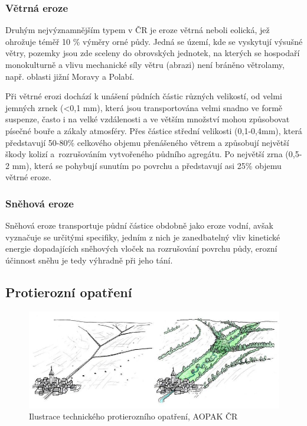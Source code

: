 \subsubsection{Větrná eroze}
Druhým nejvýznamnějším typem v ČR je eroze větrná neboli eolická, jež
ohrožuje téměř 10 \% výměry orné půdy. Jedná se území, kde se
vyskytují výsušné větry, pozemky jsou zde sceleny do obrovských
jednotek, na kterých se hospodaří monokulturně a vlivu mechanické síly
větru (abrazi) není bráněno větrolamy, např. oblasti jižní Moravy a
Polabí.

Při větrné erozi dochází k unášení půdních částic různých velikostí,
od velmi jemných zrnek (<0,1 mm), která jsou transportována velmi
snadno ve formě suspenze, často i na velké vzdálenosti a ve větším
množství mohou způsobovat písečné bouře a zákaly atmosféry. Přes
částice střední velikosti (0,1-0,4mm), která představují 50-80\%
celkového objemu přenášeného větrem a způsobují největší škody kolizí
a~rozrušováním vytvořeného půdního agregátu. Po největší zrna (0,5-2
mm), která se pohybují sunutím po povrchu a představují asi 25\%
objemu větrné eroze.\cite{Holy1994}

\subsubsection{Sněhová eroze}
Sněhová eroze transportuje půdní částice obdobně jako eroze vodní,
avšak vyznačuje se určitými specifiky, jedním z nich je zanedbatelný
vliv kinetické energie dopadajících sněhových vloček na rozrušování
povrchu půdy, erozní účinnost sněhu je tedy výhradně při jeho
tání.\cite{Holy1994}

\subsection{Protierozní opatření}
\begin{figure}[H]
    \centering
    \includegraphics[scale=0.5]{./pictures/protierozni_opatreni.jpg}
      \caption[Ilustrace technického protierozního opatření]{Ilustrace
        technického protierozního opatření, AOPAK ČR\cite{AOPAK} }
      \label{fig:r_faktor_graph}
\end{figure}

